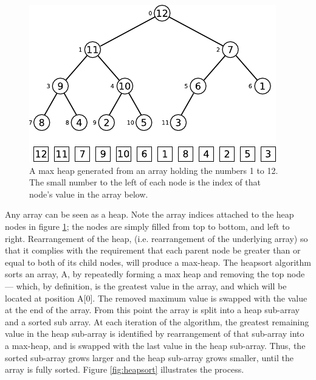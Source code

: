 \documentclass[12pt, a4paper]{article}
\begin{document}
\begin{figure}
    \centering
    \includegraphics{heap.pdf}
    \caption{\label{fig:heap}A max heap generated from an array holding the numbers 1 to 12. The small number to the left of each node is the index of that node's value in the array below.}
\end{figure}

Any array can be seen as a heap. Note the array indices attached to the heap nodes in figure \ref{fig:heap}; the nodes are simply filled from top to bottom, and left to right. Rearrangement of the heap, (i.e. rearrangement of the underlying array) so that it complies with the requirement that each parent node be greater than or equal to both of its child nodes, will produce a max-heap. The heapsort algorithm sorts an array, A, by repeatedly forming a max heap and removing the top node — which, by definition, is the greatest value in the array, and which will be located at position A[0]. The removed maximum value is swapped with the value at the end of the array. From this point the array is split into a heap sub-array and a sorted sub array. At each iteration of the algorithm, the greatest remaining value in the heap sub-array is identified by rearrangement of that sub-array into a max-heap, and is swapped with the last value in the heap sub-array. Thus, the sorted sub-array grows larger and the heap sub-array grows smaller, until the array is fully sorted. Figure \ref{fig:heapsort} illustrates the process.
\end{document}
